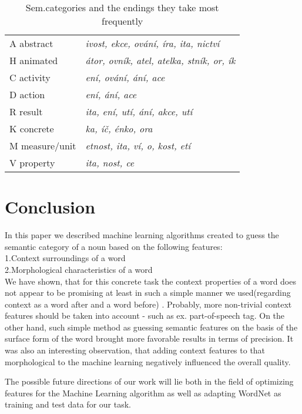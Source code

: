 \documentclass[letterpaper]{article}
\begin{document}
\begin{table}[!h]
\begin{tabular}{ll}
\hline
A abstract & \textit{ivost, ekce, ování, íra, ita, nictví}\\
H animated & \textit{átor, ovník, atel, atelka, stník, or, ík}\\
C activity & \textit{ení, ování, ání, ace}\\
D action  & \textit{ení, ání, ace}\\
R result & \textit{ ita, ení, utí, ání, akce, utí}\\
K concrete & \textit{ka, íč, énko, ora}\\
M measure/unit & \textit{etnost, ita, ví, o, kost, etí}\\
V property & \textit{ita, nost, ce}\\
\hline
\end{tabular}
\caption{Sem.categories and the endings they take most frequently}
\end{table}


\section{Conclusion}
In this paper we described machine learning algorithms
created to guess the semantic category of a noun based on the following features:\\
1.Context surroundings of a word\\
2.Morphological characteristics of a word\\
We have shown, that for this concrete task the context properties of a word
does not appear to be promising at least in such a simple manner we
used(regarding context as a word after and a word before) .
Probably, more non-trivial context features should be taken into account
- such as ex. part-of-speech tag.
On the other hand, such simple method as guessing semantic features on the
basis of the surface form of the word brought more favorable %
results in terms of precision. It was also an interesting observation, that
adding context features to that morphological to the machine learning
negatively influenced the overall quality.

The possible future directions of our work will lie both in the field of
optimizing features for the Machine Learning algorithm as well as
adapting WordNet as training and test data for our task.

 
\end{document}
